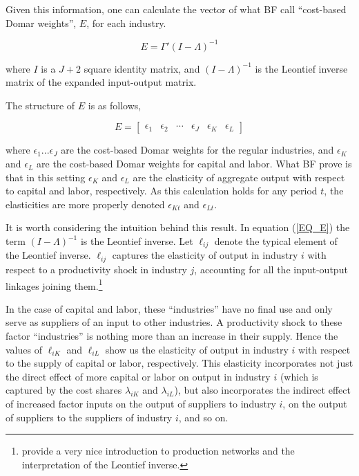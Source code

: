 \documentclass[11pt]{article}
\begin{document}
Given this information, one can calculate the vector of what BF call ``cost-based Domar weights'', $E$, for each industry. 

\begin{equation}
	E = \Gamma' (I - \Lambda)^{-1} \label{EQ_E}
\end{equation}

where $I$ is a $J+2$ square identity matrix, and $(I - \Lambda)^{-1}$ is the Leontief inverse matrix of the expanded input-output matrix. 

The structure of $E$ is as follows,

\begin{equation}
	E = 
	\begin{bmatrix}
		\epsilon_1 &
		\epsilon_2 &
		\cdots &
		\epsilon_J &
		\epsilon_K &
		\epsilon_L
	\end{bmatrix}
\end{equation}

where $\epsilon_1 ... \epsilon_J$ are the cost-based Domar weights for the regular industries, and $\epsilon_K$ and $\epsilon_L$ are the cost-based Domar weights for capital and labor. What BF prove is that in this setting $\epsilon_K$ and $\epsilon_L$ are the elasticity of aggregate output with respect to capital and labor, respectively. As this calculation holds for any period $t$, the elasticities are more properly denoted $\epsilon_{Kt}$ and $\epsilon_{Lt}$.

It is worth considering the intuition behind this result. In equation (\ref{EQ_E}) the term $(I - \Lambda)^{-1}$ is the Leontief inverse. Let $\ell_{ij}$ denote the typical element of the Leontief inverse. $\ell_{ij}$ captures the elasticity of output in industry $i$ with respect to a productivity shock in industry $j$, accounting for all the input-output linkages joining them.\footnote{\cite{cts2018} provide a very nice introduction to production networks and the interpretation of the Leontief inverse.}

In the case of capital and labor, these ``industries'' have no final use and only serve as suppliers of an input to other industries. A productivity shock to these factor ``industries'' is nothing more than an increase in their supply. Hence the values of $\ell_{iK}$ and $\ell_{iL}$ show us the elasticity of output in industry $i$ with respect to the supply of capital or labor, respectively. This elasticity incorporates not just the direct effect of more capital or labor on output in industry $i$ (which is captured by the cost shares $\lambda_{iK}$ and $\lambda_{iL}$), but also incorporates the indirect effect of increased factor inputs on the output of suppliers to industry $i$, on the output of suppliers to the suppliers of industry $i$, and so on. 
\end{document}

